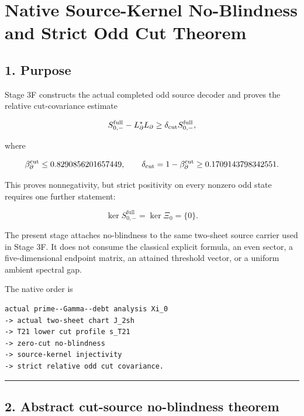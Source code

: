 \hypertarget{native-source-kernel-no-blindness-and-strict-odd-cut-theorem}{%
\chapter{Native Source-Kernel No-Blindness and Strict Odd Cut Theorem}\label{native-source-kernel-no-blindness-and-strict-odd-cut-theorem}}

\hypertarget{purpose}{%
\section{1. Purpose}\label{purpose}}

Stage 3F constructs the actual completed odd source decoder and proves the
relative cut-covariance estimate

\[
S_{0,-}^{\mathrm{full}}-L_\partial^*L_\partial
\ge
\delta_{\rm cut}S_{0,-}^{\mathrm{full}},
\]

where

\[
\beta_\partial^{\mathrm{cut}}
\le 0.8290856201657449,
\qquad
\delta_{\rm cut}
=1-\beta_\partial^{\mathrm{cut}}
\ge0.1709143798342551.
\]

This proves nonnegativity, but strict positivity on every nonzero odd state
requires one further statement:

\[
\boxed{
\ker S_{0,-}^{\mathrm{full}}
=
\ker\Xi_0
=
\{0\}.
}
\]

The present stage attaches no-blindness to the same two-sheet source carrier
used in Stage 3F. It does not consume the classical explicit formula, an even
sector, a five-dimensional endpoint matrix, an attained threshold vector, or a
uniform ambient spectral gap.

The native order is

\begin{verbatim}
actual prime--Gamma--debt analysis Xi_0
-> actual two-sheet chart J_2sh
-> T21 lower cut profile s_T21
-> zero-cut no-blindness
-> source-kernel injectivity
-> strict relative odd cut covariance.
\end{verbatim}

\begin{center}\rule{0.5\linewidth}{0.5pt}\end{center}

\hypertarget{abstract-cut-source-no-blindness-theorem}{%
\section{2. Abstract cut-source no-blindness theorem}\label{abstract-cut-source-no-blindness-theorem}}

